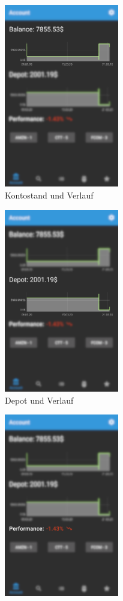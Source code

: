\documentclass[a4paper]{article}
\begin{document}
\begin{figure}[H]
    \begin{subfigure}{.5\textwidth}
        \centering
        \includegraphics[height=8cm,keepaspectratio]{./images/account/balance.png}
        \caption{Kontostand und Verlauf}
        \label{fig:functionality:account:balance}
    \end{subfigure}
    \begin{subfigure}{.5\textwidth}
        \centering
        \includegraphics[height=8cm,keepaspectratio]{./images/account/depot.png}
        \caption{Depot und Verlauf}
        \label{fig:functionality:account:depot}
    \end{subfigure}
    \begin{subfigure}{.5\textwidth}
        \centering
        \includegraphics[height=8cm,keepaspectratio]{./images/account/performance.png}

\end{subfigure}
\end{figure}
\end{document}
